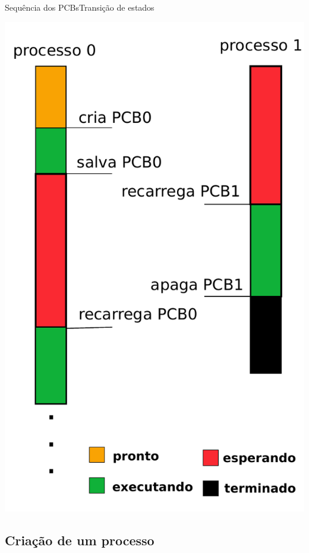 \begin{frame}{Sequência dos PCBs}{Transição de estados}

\begin{center}
	\includegraphics[scale=0.45]{pcb-sequence}
\end{center}
\end{frame}

\subsection{Criação de um processo}


